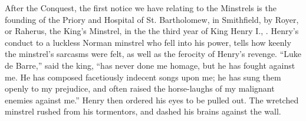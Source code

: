 
\renewcommand\rectoheader{william i. to richard i.}

After the Conquest, the first notice we have relating to the Minstrels is the 
founding of the Priory and Hospital of St. Bartholo\-mew, %
in Smithfield, by
Royer, or Raherus, the King’s Minstrel, in the the third year of King Henry I.,
. Henry’s conduct to a luckless Norman minstrel who fell into his power,
tells how keenly the minstrel’s sarcasms were felt, as well as the ferocity of Henry’s
revenge. “Luke de Barre,” said the king, “has never done me homage, but he has
fought against me. He has composed facetiously indecent songs upon me; he has
sung them openly to my prejudice, and often raised the horse-laughs of my malignant
enemies against me.” Henry then ordered his eyes to be pulled out. The
wretched minstrel rushed from his tormentors, and dashed his brains against
the wall. %


